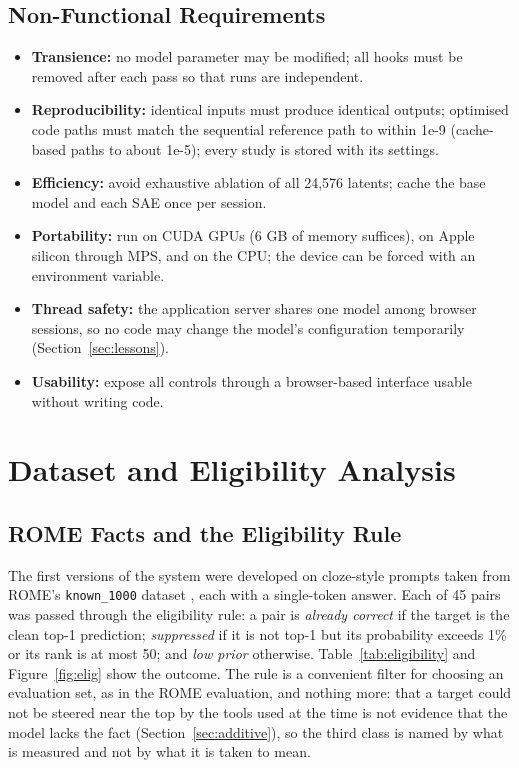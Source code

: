 \documentclass[12pt,a4paper]{report}
\begin{document}
\subsection{Non-Functional Requirements}

\begin{itemize}
  \item \textbf{Transience:} no model parameter may be modified; all hooks must be removed after each pass so that runs are independent.
  \item \textbf{Reproducibility:} identical inputs must produce identical outputs; optimised code paths must match the sequential reference path to within 1e-9 (cache-based paths to about 1e-5); every study is stored with its settings.
  \item \textbf{Efficiency:} avoid exhaustive ablation of all 24,576 latents; cache the base model and each SAE once per session.
  \item \textbf{Portability:} run on CUDA GPUs (6 GB of memory suffices), on Apple silicon through MPS, and on the CPU; the device can be forced with an environment variable.
  \item \textbf{Thread safety:} the application server shares one model among browser sessions, so no code may change the model's configuration temporarily (Section~\ref{sec:lessons}).
  \item \textbf{Usability:} expose all controls through a browser-based interface usable without writing code.
\end{itemize}

\section{Dataset and Eligibility Analysis}\label{sec:data}

\subsection{ROME Facts and the Eligibility Rule}

The first versions of the system were developed on cloze-style prompts taken from ROME's \texttt{known\_\allowbreak{}1000} dataset \cite{r2}, each with a single-token answer. Each of 45 pairs was passed through the eligibility rule: a pair is \textit{already correct} if the target is the clean top-1 prediction; \textit{suppressed} if it is not top-1 but its probability exceeds 1\% or its rank is at most 50; and \textit{low prior} otherwise. Table~\ref{tab:eligibility} and Figure~\ref{fig:elig} show the outcome. The rule is a convenient filter for choosing an evaluation set, as in the ROME evaluation, and nothing more: that a target could not be steered near the top by the tools used at the time is not evidence that the model lacks the fact (Section~\ref{sec:additive}), so the third class is named by what is measured and not by what it is taken to mean.
\end{document}
